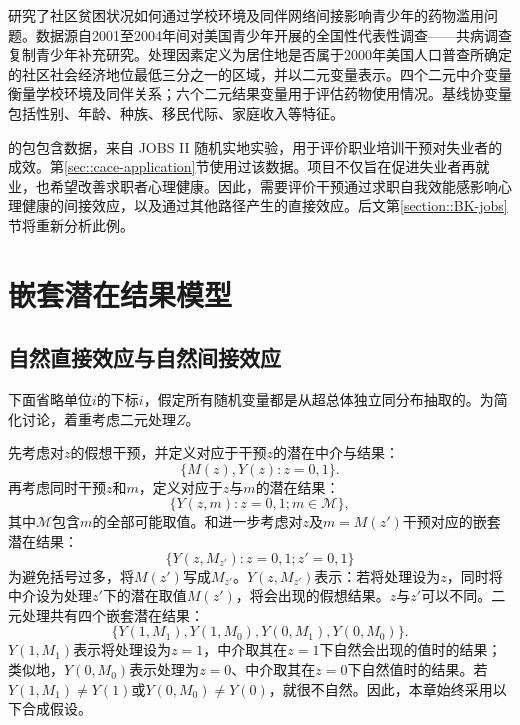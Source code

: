 \begin{example}
\citet{rudolph2018causal} 研究了社区贫困状况如何通过学校环境及同伴网络间接影响青少年的药物滥用问题。数据源自2001至2004年间对美国青少年开展的全国性代表性调查——共病调查复制青少年补充研究。处理因素定义为居住地是否属于2000年美国人口普查所确定的社区社会经济地位最低三分之一的区域，并以二元变量表示。四个二元中介变量衡量学校环境及同伴关系；六个二元结果变量用于评估药物使用情况。基线协变量包括性别、年龄、种族、移民代际、家庭收入等特征。
\end{example}


\begin{example}\label{eg::mediation-jobs}
的包包含数据，来自 JOBS II 随机实地实验，用于评价职业培训干预对失业者的成效。第\ref{sec::cace-application}节使用过该数据。项目不仅旨在促进失业者再就业，也希望改善求职者心理健康。因此，需要评价干预通过求职自我效能感影响心理健康的间接效应，以及通过其他路径产生的直接效应。后文第\ref{section::BK-jobs}节将重新分析此例。 
\end{example}



\section{嵌套潜在结果模型}


\subsection{自然直接效应与自然间接效应}

下面省略单位$i$的下标$i$，假定所有随机变量都是从超总体独立同分布抽取的。为简化讨论，着重考虑二元处理$Z$。

 
先考虑对$z$的假想干预，并定义对应于干预$z$的潜在中介与结果：
$$
\{ M(z) , Y(z): z=0,1\}.
$$
再考虑同时干预$z$和$m$，定义对应于$z$与$m$的潜在结果：
$$
\{ Y(z, m): z=0, 1; m \in \mathcal{M}  \},
$$
其中$ \mathcal{M} $包含$m$的全部可能取值。\citet{Robins::1992}和\citet{Pearl::2001}进一步考虑对$z$及$m = M(z')  $干预对应的嵌套潜在结果：
$$
\{ Y(z, M_{z'}) : z = 0,1; z'=0,1   \}
$$
为避免括号过多，将$M(z')$写成$ M_{z'}$。$Y(z, M_{z'})$表示：若将处理设为$z$，同时将中介设为处理$z'$下的潜在取值$M(z')$，将会出现的假想结果。$z$与$z'$可以不同。二元处理共有四个嵌套潜在结果：
$$
\{ Y( 1, M_1),    Y( 1, M_0),  Y( 0, M_1),  Y( 0, M_0) \}.
$$
$Y(1, M_1)$表示将处理设为$z=1$，中介取其在$z=1$下自然会出现的值时的结果；类似地，$Y(0, M_0)$表示处理为$z=0$、中介取其在$z=0$下自然值时的结果。若$Y(1, M_1) \neq  Y(1)$或$Y(0, M_0) \neq  Y(0)$，就很不自然。因此，本章始终采用以下合成假设。


